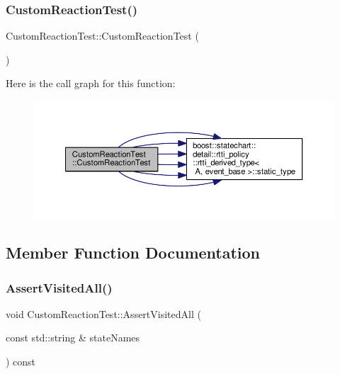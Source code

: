 \subsubsection{\texorpdfstring{Custom\+Reaction\+Test()}{CustomReactionTest()}}
{\footnotesize\ttfamily Custom\+Reaction\+Test\+::\+Custom\+Reaction\+Test (\begin{DoxyParamCaption}{ }\end{DoxyParamCaption})}

Here is the call graph for this function\+:
\nopagebreak
\begin{figure}[H]
\begin{center}
\leavevmode
\includegraphics[width=350pt]{struct_custom_reaction_test_a3edaf9d7a2d27269ecfc4a37d4e7a072_cgraph}
\end{center}
\end{figure}


\subsection{Member Function Documentation}
\mbox{\label{struct_custom_reaction_test_a0f75c5c035c97fa960064afa6656ae06}} 
\subsubsection{\texorpdfstring{Assert\+Visited\+All()}{AssertVisitedAll()}}
{\footnotesize\ttfamily void Custom\+Reaction\+Test\+::\+Assert\+Visited\+All (\begin{DoxyParamCaption}\item[{const std\+::string \&}]{state\+Names }\end{DoxyParamCaption}) const\hspace{0.3cm}{\ttfamily [inline]}}

